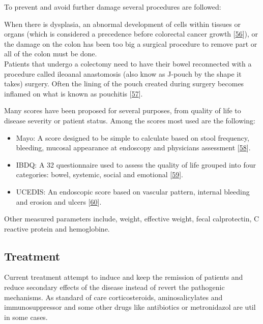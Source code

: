 \documentclass[
  a4paper,
]{book}
\begin{document}
To prevent and avoid further damage several procedures are followed:

When there is dysplasia, an abnormal development of cells within tissues or organs (which is considered a precedence before colorectal cancer growth {[}\protect\hyperlink{ref-mark-christensen2018}{56}{]}), or the damage on the colon has been too big a surgical procedure to remove part or all of the colon must be done.\\
Patients that undergo a colectomy need to have their bowel reconnected with a procedure called ileoanal anastomosis (also know as J-pouch by the shape it takes) surgery.
Often the lining of the pouch created during surgery becomes inflamed on what is known as pouchitis {[}\protect\hyperlink{ref-schieffer2016}{57}{]}.

Many scores have been proposed for several purposes, from quality of life to disease severity or patient status.
Among the scores most used are the following:

\begin{itemize}
\item
  Mayo: A score designed to be simple to calculate based on stool frequency, bleeding, mucosal appearance at endoscopy and physicians assessment {[}\protect\hyperlink{ref-schroeder1987}{58}{]}.
\item
  IBDQ: A 32 questionnaire used to assess the quality of life grouped into four categories: bowel, systemic, social and emotional {[}\protect\hyperlink{ref-irvine1999}{59}{]}.
\item
  UCEDIS: An endoscopic score based on vascular pattern, internal bleeding and erosion and ulcers {[}\protect\hyperlink{ref-travis2012}{60}{]}.
\end{itemize}

Other measured parameters include, weight, effective weight, fecal calprotectin, C reactive protein and hemoglobine.

\hypertarget{treatment}{%
\subsection{Treatment}\label{treatment}}

Current treatment attempt to induce and keep the remission of patients and reduce secondary effects of the disease instead of revert the pathogenic mechanisms.
As standard of care corticosteroids, aminosalicylates and immunosuppressor and some other drugs like antibiotics or metronidazol are util in some cases.
\end{document}
